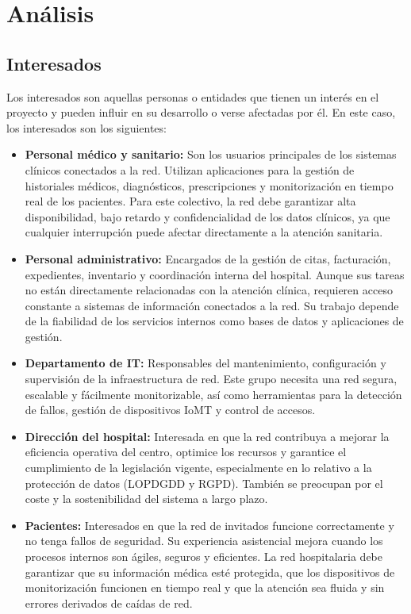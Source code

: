 
\chapter{Análisis }\label{análisis}

\section{Interesados}
Los interesados son aquellas personas o entidades que tienen un interés en el proyecto y pueden influir en su desarrollo o verse afectadas por él. En este caso, 
los interesados son los siguientes:

\begin{itemize}
    \item \textbf{Personal médico y sanitario:} Son los usuarios principales de los sistemas clínicos conectados a la red. Utilizan aplicaciones para la gestión de 
    historiales médicos, diagnósticos, prescripciones y monitorización en tiempo real de los pacientes. Para este colectivo, la red debe garantizar alta disponibilidad, 
    bajo retardo y confidencialidad de los datos clínicos, ya que cualquier interrupción puede afectar directamente a la atención sanitaria.
    \item \textbf{Personal administrativo:} Encargados de la gestión de citas, facturación, expedientes, inventario y coordinación interna del hospital. Aunque sus tareas 
    no están directamente relacionadas con la atención clínica, requieren acceso constante a sistemas de información conectados a la red. Su trabajo depende de la fiabilidad 
    de los servicios internos como bases de datos y aplicaciones de gestión.
    \item \textbf{Departamento de IT:} Responsables del mantenimiento, configuración y supervisión de la infraestructura de red. Este grupo necesita una red segura, escalable 
    y fácilmente monitorizable, así como herramientas para la detección de fallos, gestión de dispositivos IoMT y control de accesos.
    \item \textbf{Dirección del hospital:} Interesada en que la red contribuya a mejorar la eficiencia operativa del centro, optimice los recursos y garantice el cumplimiento 
    de la legislación vigente, especialmente en lo relativo a la protección de datos (\ac{LOPDGDD} y \ac{RGPD}). También se preocupan por el coste y la sostenibilidad del sistema a 
    largo plazo.
    \item \textbf{Pacientes:} Interesados en que la red de invitados funcione correctamente y no tenga fallos de seguridad. Su experiencia asistencial mejora cuando los 
    procesos internos son ágiles, seguros y eficientes. La red hospitalaria debe garantizar que su información médica esté protegida, que los dispositivos de monitorización 
    funcionen en tiempo real y que la atención sea fluida y sin errores derivados de caídas de red.
\end{itemize}

